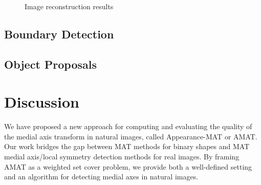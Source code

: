 \documentclass[10pt,twocolumn,letterpaper]{article}
\begin{document}
\begin{figure}[t]
\centering
\caption{Image reconstruction results}
\label{fig:reconstruction}
\end{figure}


\subsection{Boundary Detection}\label{sec:experiments:edges}



\subsection{Object Proposals}\label{sec:experiments:proposals}




\section{Discussion}\label{sec:discussion}
We have proposed a new approach for computing and evaluating the quality of the medial axis transform in 
natural images, called Appearance-MAT or AMAT.
Our work bridges the gap between MAT methods for binary shapes and MAT medial axis/local symmetry detection methods
for real images.
By framing AMAT as a weighted set cover problem, we provide both a well-defined setting and an algorithm for 
detecting medial axes in natural images.



{\small


}
\end{document}
